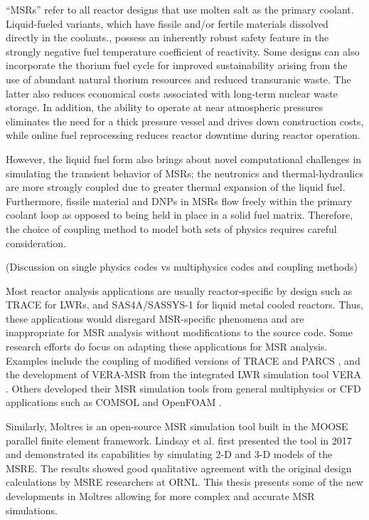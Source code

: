 ``\glspl{MSR}'' refer to all reactor designs that use molten salt as the
primary coolant. Liquid-fueled variants, which have fissile and/or fertile
materials dissolved directly in the coolants.,
possess an inherently robust safety feature in the strongly negative fuel
temperature coefficient of reactivity. Some designs can also incorporate the
thorium fuel cycle for improved sustainability arising from the use of
abundant natural thorium resources and reduced transuranic waste. The
latter also reduces economical costs
associated with long-term nuclear waste storage. In addition, the ability to
operate at near atmospheric pressures eliminates the need for a thick pressure
vessel and drives down construction costs, while online fuel reprocessing
reduces reactor downtime during reactor operation.

However, the liquid fuel form also brings about novel computational
challenges in simulating the transient behavior of \glspl{MSR}; the
neutronics and thermal-hydraulics are more strongly coupled due
to greater thermal expansion of the liquid fuel. Furthermore, fissile material
and \glspl{DNP} in \glspl{MSR} flow freely within the primary coolant
loop as opposed to being held in place in a solid fuel matrix. Therefore,
the choice of coupling method to model both sets of physics requires careful
consideration.

(Discussion on single physics codes vs multiphysics codes and coupling methods)

Most reactor analysis applications are usually reactor-specific by
design such as TRACE \cite{nrc_trace_nodate} for \glspl{LWR}, and
SAS4A/SASSYS-1 \cite{fanning_sas4a/sassys-1_2017} for
liquid metal cooled reactors. Thus, these applications would disregard
\gls{MSR}-specific phenomena and are inappropriate for \gls{MSR}
analysis without modifications to the source code. Some research efforts
do focus on adapting these applications for \gls{MSR} analysis. Examples
include the coupling of modified versions of TRACE and PARCS
\cite{pettersen_coupled_2016}, and the development of VERA-MSR from the
integrated \gls{LWR} simulation tool VERA \cite{graham_development_2019}.
Others developed their \gls{MSR} simulation tools from general
multiphysics or \gls{CFD} applications such as COMSOL
\cite{fiorina_modelling_2014} and OpenFOAM \cite{aufiero_development_2014}.

Similarly, Moltres \cite{lindsay_introduction_2018} is an open-source MSR
simulation tool built in the \gls{MOOSE} \cite{gaston_physics-based_2015}
parallel finite element framework. Lindsay et al.
\cite{lindsay_introduction_2018} first presented the tool in 2017 and
demonstrated its capabilities by simulating 2-D and 3-D models of the
\gls{MSRE}. The results showed good qualitative
agreement with the original design calculations by \gls{MSRE} researchers at
\gls{ORNL}. This thesis presents some of the new developments in Moltres
allowing for more complex and accurate \gls{MSR} simulations.

